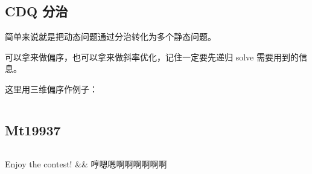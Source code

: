 \documentclass[titlepage, a4paper]{article}
\begin{document}
\begin{multicols}{2}
\begin{spacing}{0.6}
			 	\subsection{CDQ 分治}
			 		简单来说就是把动态问题通过分治转化为多个静态问题。
			 		
			 		可以拿来做偏序，也可以拿来做斜率优化，记住一定要先递归 solve 需要用到的信息。
			 		
			 		这里用三维偏序作例子：
			 		
			 		\inputminted{cpp}{src/Misc/Cdq.cpp}
			 	\subsection{Mt19937}
			 		\inputminted{cpp}{src/Misc/Mt19937.cpp}
		\end{spacing}
			\endgroup
	\end{multicols}
	
	\begin{center}
		\LARGE{Enjoy the contest! \&\& 哼嗯嗯啊啊啊啊啊啊}
	\end{center}
		
	
\end{document}
